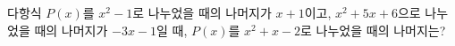 다항식 $P(x)$를 $x^2-1$로 나누었을 때의 나머지가 $x+1$이고, $x^2+5x+6$으로 나누었을 때의 나머지가 $-3x-1$일 때, $P(x)$를 $x^2+x-2$로 나누었을 때의 나머지는?
